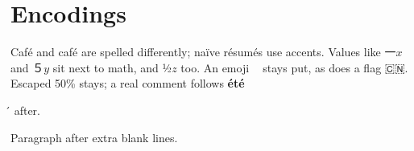 ﻿\documentclass{article}
\begin{document}
\section{Encodings}
Café and café are spelled differently; naïve résumés use accents.  
Values like 一$x$ and ５$y$ sit next to math, and ½$z$ too.
An emoji 👍🏽 stays put, as does a flag 🇨🇳.
Escaped 50\% stays; a real comment follows %
\textbf{été}\ignoré after.



Paragraph after extra blank lines.
\end{document}
